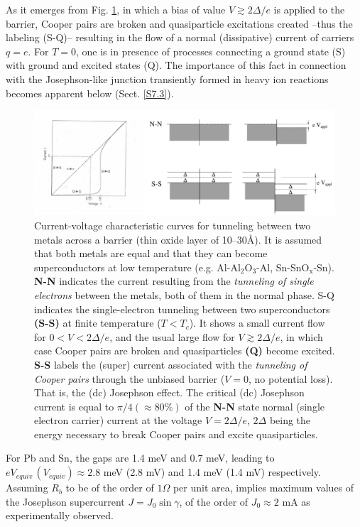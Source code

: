 As it emerges from Fig. \ref{fig4.6.1}, in which a bias of value $V\gtrsim2\Delta/e$ is applied to the barrier, Cooper pairs are broken and quasiparticle excitations created --thus the labeling (S-Q)-- resulting in the flow of a normal (dissipative) current of carriers $q=e$. For $T=0$, one is in presence of processes connecting a ground state (S) with ground and excited states (Q). The importance of this fact in connection with the Josephson-like junction transiently formed in heavy ion reactions becomes apparent below (Sect. \ref{S7.3}).
  
  \begin{figure}
  	\centerline{\includegraphics[width=17cm]{C6/figs_C6/fig4_6_1x}}
  	\caption{Current-voltage characteristic curves for tunneling between two metals across a barrier (thin oxide layer of 10--30\AA). It is assumed that both metals are  equal and that they can become superconductors at low temperature (e.g. Al-Al$_2$O$_3$-Al, Sn-SnO$_\text{x}$-Sn). \textbf{N-N} indicates the  current resulting from the \textit{tunneling of single electrons} between the metals, both of them in the normal phase. S-Q indicates the single-electron tunneling between two superconductors \textbf{(S-S)} at finite temperature ($T<T_c$). It shows a small current flow for $0<V<2\Delta/e$, and the usual large flow for $V\gtrsim2\Delta/e$, in which case Cooper pairs are broken and quasiparticles \textbf{(Q)} become excited. \textbf{S-S} labels the (super) current associated with the \textit{tunneling of Cooper pairs} through the unbiased barrier ($V=0$, no potential loss). That is, the (dc) Josephson effect. The critical (dc) Josephson current  is equal to $\pi/4(\approx80\%)$ of the \textbf{N-N} state normal (single electron carrier) current at the  voltage $V=2\Delta/e$, $2\Delta$ being the energy necessary to break Cooper pairs and excite quasiparticles.}\label{fig4.6.1}
  \end{figure}
  
  For Pb and Sn, the gaps are 1.4 meV and 0.7 meV, leading to $e V_{equiv} \,(V_{equiv})\approx 2.8$ meV (2.8 mV) and 1.4 meV (1.4 mV) respectively. Assuming $R_b$ to be of the order of $1\Omega$ per unit area, implies maximum values of the Josephson supercurrent $J=J_0\sin\gamma$, of the order of $J_0\approx 2$ mA as experimentally observed.
 
